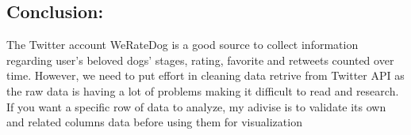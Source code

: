 \documentclass[11pt]{article}
\begin{document}
    \hypertarget{conclusion}{%
\subsection{Conclusion:}\label{conclusion}}

    The Twitter account WeRateDog is a good source to collect information
regarding user's beloved dogs' stages, rating, favorite and retweets
counted over time. However, we need to put effort in cleaning data
retrive from Twitter API as the raw data is having a lot of problems
making it difficult to read and research. If you want a specific row of
data to analyze, my adivise is to validate its own and related columns
data before using them for visualization


    
    
    
    
\end{document}
